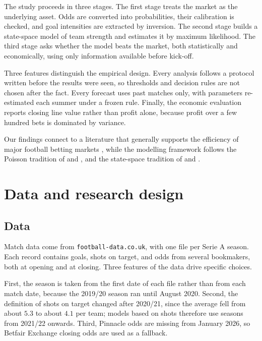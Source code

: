 \documentclass[11pt,a4paper]{article}
\begin{document}
The study proceeds in three stages. The first stage treats the market as the underlying asset. Odds
are converted into probabilities, their calibration is checked, and goal intensities are extracted by
inversion. The second stage builds a state-space model of team strength and estimates it by maximum
likelihood. The third stage asks whether the model beats the market, both statistically and
economically, using only information available before kick-off.

Three features distinguish the empirical design. Every analysis follows a protocol written before the
results were seen, so thresholds and decision rules are not chosen after the fact. Every forecast uses
past matches only, with parameters re-estimated each summer under a frozen rule. Finally, the economic
evaluation reports closing line value rather than profit alone, because profit over a few hundred bets
is dominated by variance.

Our findings connect to a literature that generally supports the efficiency of major football betting
markets \citep{ers2020}, while the modelling framework follows the Poisson tradition of
\citet{maher1982} and \citet{dixoncoles1997}, and the state-space tradition of \citet{harvey1989} and
\citet{durbinkoopman2012}.

\section{Data and research design}
\subsection{Data}
Match data come from \texttt{football-data.co.uk}, with one file per Serie A season. Each record
contains goals, shots on target, and odds from several bookmakers, both at opening and at closing.
Three features of the data drive specific choices.

First, the season is taken from the first date of each file rather than from each match date, because
the 2019/20 season ran until August 2020. Second, the definition of shots on target changed after
2020/21, since the average fell from about $5.3$ to about $4.1$ per team; models based on shots
therefore use seasons from 2021/22 onwards. Third, Pinnacle odds are missing from January 2026, so
Betfair Exchange closing odds are used as a fallback.
\end{document}
